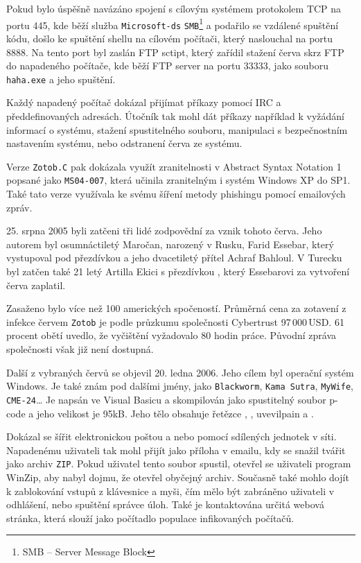 \documentclass[a4paper,12pt]{article}
\begin{document}
Pokud bylo úspěšně navázáno spojení s cílovým systémem protokolem TCP na portu 445, kde běží služba \texttt{Microsoft-ds} \texttt{SMB}\footnote{SMB -- Server Message Block} a podařilo se vzdálené spuštění kódu, došlo ke spuštění shellu na cílovém počítači, který naslouchal na portu 8888. Na tento port byl zaslán FTP sctipt, který zařídil stažení červa skrz FTP do napadeného počítače, kde běží FTP server na portu 33333, jako souboru \texttt{haha.exe} a jeho spuštění\cite{zotob-fsecure}\cite{zotobb-fsecure}.

Každý napadený počítač dokázal přijímat příkazy pomocí IRC a předdefinovaných adresách. Útočník tak mohl dát příkazy například k vyžádání informací o systému, stažení spustitelného souboru, manipulaci s bezpečnostním nastavením systému, nebo odstranení červa ze systému.

Verze \texttt{Zotob.C} pak dokázala využít zranitelnosti v Abstract Syntax Notation 1 popsané jako \texttt{MS04-007}, která učinila zranitelným i systém Windows XP do SP1\cite{zotob-msbulletin2}. Také tato verze využívala ke svému šíření metody phishingu pomocí emailových zpráv.\cite{zotobc-fsecure}

25. srpna 2005 byli zatčeni tři lidé zodpovědní za vznik tohoto červa. Jeho autorem byl osumnáctiletý Maročan, narozený v Rusku, Farid Essebar, který vystupoval pod přezdívkou  a jeho dvacetiletý přítel Achraf Bahloul. V Turecku byl zatčen také 21 letý Artilla Ekici s přezdívkou , který Essebarovi za vytvoření červa zaplatil.\cite{zotob-schneider}\cite{zotob-fbi}

Zasaženo bylo více než 100 amerických spočeností\cite{zotob-fbi}. Průměrná cena za zotavení z infekce červem \texttt{Zotob} je podle průzkumu společnosti Cybertrust 97\,000\,USD. 61 procent obětí uvedlo, že vyčištění vyžadovalo 80 hodin práce.\cite{zotob-wikidot}\cite{zotob-cnet} Původní zpráva společnosti však již není dostupná.

Další z vybraných červů se objevil 20. ledna 2006\cite{nyxem-wiki}. Jeho cílem byl operační systém Windows. Je také znám pod dalšími jmény, jako \texttt{Blackworm}, \texttt{Kama Sutra}, \texttt{MyWife}, \texttt{CME-24}\dots\cite{nyxem-caida} Je napsán ve Visual Basicu a skompilován jako spustitelný soubor p-code a jeho velikost je 95kB. Jeho tělo obsahuje řetězce , , uv{evilpain} a .\cite{nyxem-fsecure} 

Dokázal se šířit elektronickou poštou a nebo pomocí sdílených jednotek v síti. Napadenému uživateli tak mohl přijít jako příloha v emailu, kdy se snažil tvářit jako archiv \texttt{ZIP}. Pokud uživatel tento soubor spustil, otevřel se uživateli program WinZip, aby nabyl dojmu, že otevřel obyčejný archiv\cite{nyxem-trendmicro}. Současně také mohlo dojít k zablokování vstupů z klávesnice a myši, čím mělo být zabráněno uživateli v odhlášení, nebo spuštění správce úloh\cite{nyxem-fsecure}\cite{nyxem-trendmicro}. Také je kontaktována určitá webová stránka, která slouží jako počítadlo populace infikovaných počítačů.
\end{document}
